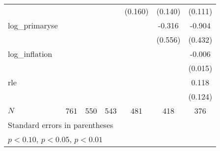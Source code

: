{\begin{tabular}{l*{6}{c}}
            &                     &                     &                     &     (0.160)         &     (0.140)         &     (0.111)         \\
\addlinespace
log\_primaryse&                     &                     &                     &                     &      -0.316         &      -0.904\sym{**} \\
            &                     &                     &                     &                     &     (0.556)         &     (0.432)         \\
\addlinespace
log\_inflation&                     &                     &                     &                     &                     &      -0.006         \\
            &                     &                     &                     &                     &                     &     (0.015)         \\
\addlinespace
rle         &                     &                     &                     &                     &                     &       0.118         \\
            &                     &                     &                     &                     &                     &     (0.124)         \\
\midrule
\(N\)       &         761         &         550         &         543         &         481         &         418         &         376         \\
\bottomrule
\multicolumn{7}{l}{\footnotesize Standard errors in parentheses}\\
\multicolumn{7}{l}{\footnotesize \sym{*} \(p<0.10\), \sym{**} \(p<0.05\), \sym{***} \(p<0.01\)}\\
\end{tabular}
}
